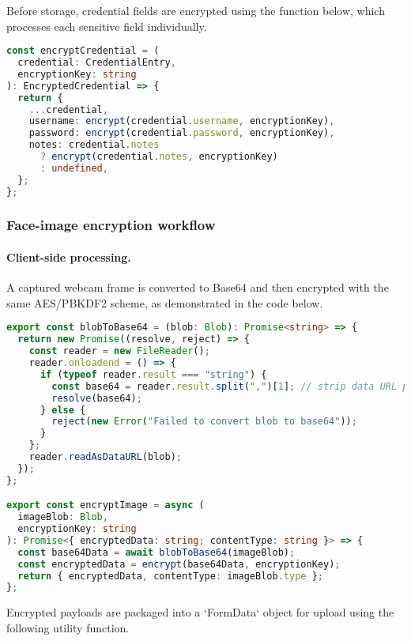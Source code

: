 Before storage, credential fields are encrypted using the function below, which processes each sensitive field individually.

\begin{lstlisting}[language=TypeScript, caption={Encryption of credential fields before storage}, label={lst:encrypt-credential}]
const encryptCredential = (
  credential: CredentialEntry,
  encryptionKey: string
): EncryptedCredential => {
  return {
    ...credential,
    username: encrypt(credential.username, encryptionKey),
    password: encrypt(credential.password, encryptionKey),
    notes: credential.notes
      ? encrypt(credential.notes, encryptionKey)
      : undefined,
  };
};
\end{lstlisting}

\subsubsection{Face-image encryption workflow}

\paragraph{Client-side processing.}
A captured webcam frame is converted to Base64 and then encrypted with the same AES/PBKDF2 scheme, as demonstrated in the code below.

\begin{lstlisting}[language=TypeScript, caption={Client-side webcam image processing and encryption}, label={lst:image-processing}]
export const blobToBase64 = (blob: Blob): Promise<string> => {
  return new Promise((resolve, reject) => {
    const reader = new FileReader();
    reader.onloadend = () => {
      if (typeof reader.result === "string") {
        const base64 = reader.result.split(",")[1]; // strip data URL prefix
        resolve(base64);
      } else {
        reject(new Error("Failed to convert blob to base64"));
      }
    };
    reader.readAsDataURL(blob);
  });
};

export const encryptImage = async (
  imageBlob: Blob,
  encryptionKey: string
): Promise<{ encryptedData: string; contentType: string }> => {
  const base64Data = await blobToBase64(imageBlob);
  const encryptedData = encrypt(base64Data, encryptionKey);
  return { encryptedData, contentType: imageBlob.type };
};
\end{lstlisting}

Encrypted payloads are packaged into a `FormData` object for upload using the following utility function.

